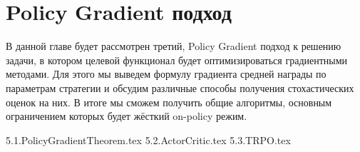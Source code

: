 \chapter{Policy Gradient подход}\label{policygradientchapter}

В данной главе будет рассмотрен третий, Policy Gradient подход к решению задачи, в котором целевой функционал будет оптимизироваться градиентными методами. Для этого мы выведем формулу градиента средней награды по параметрам стратегии и обсудим различные способы получения стохастических оценок на них. В итоге мы сможем получить общие алгоритмы, основным ограничением которых будет жёсткий on-policy режим.

{5.1.PolicyGradientTheorem.tex}
{5.2.ActorCritic.tex}
{5.3.TRPO.tex}